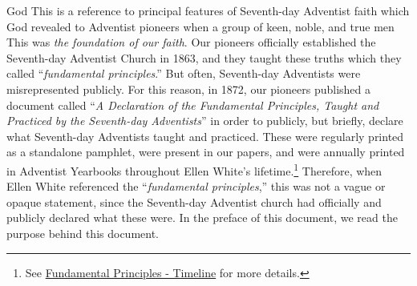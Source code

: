 God  This is a reference to principal features of Seventh-day Adventist faith which God revealed to Adventist pioneers  when a group of keen, noble, and true men  This was \textit{the foundation of our faith}. Our pioneers officially established the Seventh-day Adventist Church in 1863, and they taught these truths which they called “\textit{fundamental principles}.” But often, Seventh-day Adventists were misrepresented publicly. For this reason, in 1872, our pioneers published a document called “\textit{A Declaration of the Fundamental Principles, Taught and Practiced by the Seventh-day Adventists}” in order to publicly, but briefly, declare what  Seventh-day Adventists taught and practiced. These  were regularly printed as a standalone pamphlet, were present in our papers, and were annually printed in Adventist Yearbooks throughout Ellen White's lifetime.\footnote{See \hyperref[appendix:timeline]{Fundamental Principles - Timeline} for more details.} Therefore, when Ellen White referenced the “\textit{fundamental principles},” this was not a vague or opaque statement, since the Seventh-day Adventist church had officially and publicly declared what these  were. In the preface of this document, we read the purpose behind this document.


